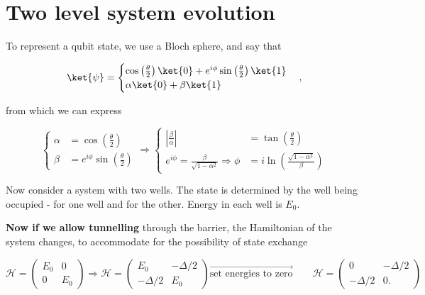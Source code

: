 \section{Two level system evolution\label{sec:firstLecture}}
   To represent a qubit state, we use a Bloch sphere, and say that
   
   \begin{equation}
	   \label{eqn:bloch}
	   \ket{\psi} = \begin{cases}
		   \cos\left(\frac{\theta}{2}\right)\ket{0} + e^{i\phi}\sin\left(\frac{\theta}{2}\right)\ket{1}\\
		   \alpha\ket{0}+\beta\ket{1}
	   \end{cases},
   \end{equation}
   
   \noindent from which we can express
   
   \begin{equation}
	   \left\lbrace\begin{aligned}
		   \alpha & = \cos\left(\frac{\theta}{2}\right)\\
		   \beta & = e^{i\phi}\sin\left(\frac{\theta}{2}\right)
	   \end{aligned}\right. \Rightarrow
	   \left\lbrace\begin{aligned}
		   \left|\frac{\beta}{\alpha}\right| & =\tan\left(\frac{\theta}{2}\right)\\
		   e^{i\phi} = \frac{\beta}{\sqrt{1-\alpha^2}}\Rightarrow \phi & = i\ln\left(\frac{\sqrt{1-\alpha^2}}{\beta}\right)
	   \end{aligned}\right.
   \end{equation}
   
   \noindent Now consider a system with two wells. The state is determined by the well being occupied -  for one well and  for the other. Energy in each well is $E_0$.
   
   \textbf{Now if we allow tunnelling} through the barrier, the Hamiltonian of the system changes, to accommodate for the possibility of state exchange
   
   \begin{equation}
	   \label{l1-decreaseBarrier}
	   \mathcal{H} = \begin{pmatrix}
	   E_0 & 0 \\ 0 & E_0
	   \end{pmatrix} \Rightarrow
	   \mathcal{H} = \begin{pmatrix}
		   E_0 & -\Delta/2\\-\Delta/2 & E_0
	   \end{pmatrix} \overrightarrow{\text{set energies to zero}} \qquad
	   \mathcal{H} = \begin{pmatrix}
	   0 & -\Delta/2\\-\Delta/2 & 0.
	   \end{pmatrix}
   \end{equation}
   
